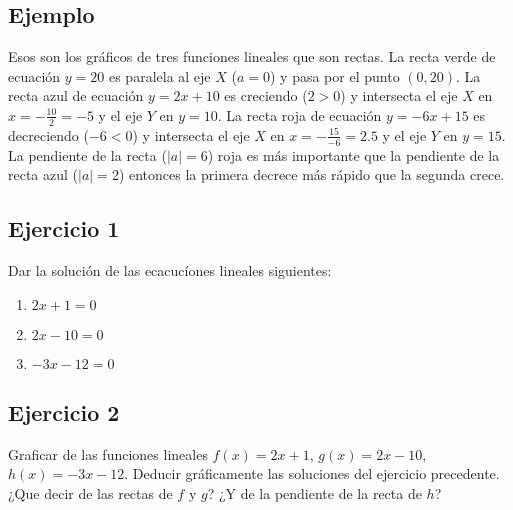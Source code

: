 \subsection*{Ejemplo}

Esos son los gráficos de tres funciones lineales que son rectas. La recta
verde de ecuación $y = 20$ es paralela al eje $X$ ($a = 0$) y pasa por el punto
$(0,20)$. La recta azul de ecuación $y = 2x + 10$ es creciendo ($2 > 0$) y
intersecta el eje $X$ en $x = -\frac{10}{2} = -5$ y el eje $Y$ en
$y = 10$. La recta roja de ecuación $y = -6x + 15$ es decreciendo ($-6 < 0$) y
intersecta el eje $X$ en $x = -\frac{15}{-6} = 2.5$ y el eje $Y$ en $y = 15$.
La pendiente de la recta ($|a|=6$) roja es más importante que la pendiente de
la recta azul ($|a|=2$) entonces la primera decrece más rápido que la segunda
crece.

\begin{center}
\end{center}

\subsection*{Ejercicio 1}

Dar la solución de las ecacucíones lineales siguientes:

\begin{enumerate}
\item $2x+1 = 0$
\item $2x-10 = 0$
\item $-3x-12 = 0$
\end{enumerate}

\subsection*{Ejercicio 2}

Graficar de las funciones lineales
$f(x) = 2x+1$, $g(x) = 2x-10$, $h(x)=-3x-12$. Deducir gráficamente
las soluciones del ejercicio precedente.
¿Que decir de las rectas de $f$ y $g$? ¿Y de la pendiente de la recta de $h$?

